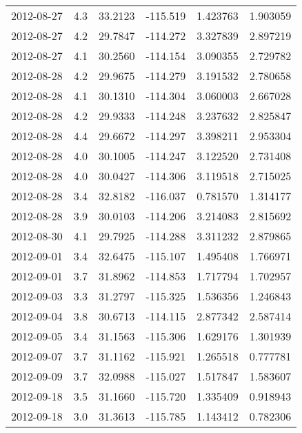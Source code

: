 \begin{tabular}{lrrrrr}
2012-08-27 &       4.3 &  33.2123 &  -115.519 &         1.423763 &         1.903059 \\
2012-08-27 &       4.2 &  29.7847 &  -114.272 &         3.327839 &         2.897219 \\
2012-08-27 &       4.1 &  30.2560 &  -114.154 &         3.090355 &         2.729782 \\
2012-08-28 &       4.2 &  29.9675 &  -114.279 &         3.191532 &         2.780658 \\
2012-08-28 &       4.1 &  30.1310 &  -114.304 &         3.060003 &         2.667028 \\
2012-08-28 &       4.2 &  29.9333 &  -114.248 &         3.237632 &         2.825847 \\
2012-08-28 &       4.4 &  29.6672 &  -114.297 &         3.398211 &         2.953304 \\
2012-08-28 &       4.0 &  30.1005 &  -114.247 &         3.122520 &         2.731408 \\
2012-08-28 &       4.0 &  30.0427 &  -114.306 &         3.119518 &         2.715025 \\
2012-08-28 &       3.4 &  32.8182 &  -116.037 &         0.781570 &         1.314177 \\
2012-08-28 &       3.9 &  30.0103 &  -114.206 &         3.214083 &         2.815692 \\
2012-08-30 &       4.1 &  29.7925 &  -114.288 &         3.311232 &         2.879865 \\
2012-09-01 &       3.4 &  32.6475 &  -115.107 &         1.495408 &         1.766971 \\
2012-09-01 &       3.7 &  31.8962 &  -114.853 &         1.717794 &         1.702957 \\
2012-09-03 &       3.3 &  31.2797 &  -115.325 &         1.536356 &         1.246843 \\
2012-09-04 &       3.8 &  30.6713 &  -114.115 &         2.877342 &         2.587414 \\
2012-09-05 &       3.4 &  31.1563 &  -115.306 &         1.629176 &         1.301939 \\
2012-09-07 &       3.7 &  31.1162 &  -115.921 &         1.265518 &         0.777781 \\
2012-09-09 &       3.7 &  32.0988 &  -115.027 &         1.517847 &         1.583607 \\
2012-09-18 &       3.5 &  31.1660 &  -115.720 &         1.335409 &         0.918943 \\
2012-09-18 &       3.0 &  31.3613 &  -115.785 &         1.143412 &         0.782306 \\

\end{tabular}
